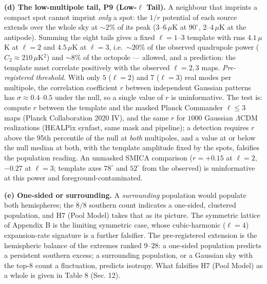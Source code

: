 \documentclass[
  11pt,
]{article}
\begin{document}
\textbf{(d) The low-multipole tail, P9 (Low-\(\ell\) Tail).} A neighbour
that imprints a compact spot cannot imprint \emph{only} a spot: the
\(1/r\) potential of each source extends over the whole sky at
\(\sim\!2\%\) of its peak (\(3\)--\(6\,\mu\)K at \(90^\circ\),
\(2\)--\(4\,\mu\)K at the antipode). Summing the eight tails gives a
fixed \(\ell = 1\)--\(3\) template with rms \(4.1\,\mu\)K at \(\ell=2\)
and \(4.5\,\mu\)K at \(\ell=3\), i.e.~\(\sim\!20\%\) of the observed
quadrupole power (\(C_2 \approx 210\,\mu\)K\(^2\)) and \(\sim\!8\%\) of
the octopole --- allowed, and a prediction: the template must correlate
positively with the observed \(\ell = 2, 3\) maps. \emph{Pre-registered
threshold.} With only \(5\) (\(\ell=2\)) and \(7\) (\(\ell=3\)) real
modes per multipole, the correlation coefficient \(r\) between
independent Gaussian patterns has \(\sigma \approx 0.4\)--\(0.5\) under
the null, so a single value of \(r\) is uninformative. The test is:
compute \(r\) between the template and the masked Planck Commander
\(\ell \le 3\) maps (Planck Collaboration 2020 IV), and the same \(r\)
for \(1000\) Gaussian \(\Lambda\)CDM realizations (HEALPix synfast, same
mask and pipeline); a detection requires \(r\) above the 95th percentile
of the null at \emph{both} multipoles, and a value at or below the null
median at both, with the template amplitude fixed by the spots,
falsifies the population reading. An unmasked SMICA comparison
(\(r = +0.15\) at \(\ell=2\), \(-0.27\) at \(\ell=3\); template axes
\(78^\circ\) and \(52^\circ\) from the observed) is uninformative at
this power and foreground-contaminated.

\textbf{(e) One-sided or surrounding.} A \emph{surrounding} population
would populate both hemispheres; the \(8/8\) southern count indicates a
one-sided, clustered population, and H7 (Pool Model) takes that as its
picture. The symmetric lattice of Appendix B is the limiting symmetric
case, whose cubic-harmonic (\(\ell = 4\)) expansion-rate signature is a
further falsifier. The pre-registered extension is the hemispheric
balance of the extremes ranked \(9\)--\(28\): a one-sided population
predicts a persistent southern excess; a surrounding population, or a
Gaussian sky with the top-8 count a fluctuation, predicts isotropy. What
falsifies H7 (Pool Model) as a whole is given in Table 8 (Sec. 12).
\end{document}
